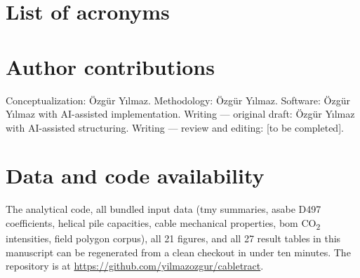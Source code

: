 \documentclass[11pt,a4paper]{article}
\newcommand{\cabletractrepo}{\url{https://github.com/yilmazozgur/cabletract}}
\begin{document}
\appendix
\section{List of acronyms}\label{sec:acronyms}
\printglossary[type=\acronymtype,title={},toctitle={List of acronyms}]

\section*{Author contributions}
Conceptualization: Özgür Yılmaz. Methodology: Özgür Yılmaz. Software: Özgür Yılmaz with AI-assisted implementation. Writing --- original draft: Özgür Yılmaz with AI-assisted structuring. Writing --- review and editing: [to be completed].

\section*{Data and code availability}
The analytical code, all bundled input data (\gls{tmy} summaries, \gls{asabe} D497 coefficients, helical pile capacities, cable mechanical properties, \gls{bom} CO\textsubscript{2} intensities, field polygon corpus), all 21 figures, and all 27 result tables in this manuscript can be regenerated from a clean checkout in under ten minutes. The repository is at \cabletractrepo.

\end{document}
